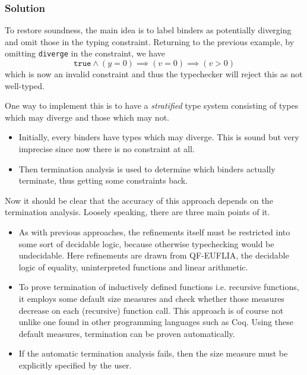 \documentclass[a4paper,UKenglish]{lipics-v2016}
\begin{document}
    \subsubsection{Solution}
      
      To restore soundness, the main idea is to label binders as potentially
      diverging and omit those in the typing constraint.  Returning to the
      previous example, by omitting \texttt{diverge} in the constraint, we have
      $$\mathtt{true}\wedge(y=0)\implies(v=0)\implies(v>0)$$
      which is now an invalid constraint and thus the typechecker will reject
      this as not well-typed.

      One way to implement this is to have a \emph{stratified} type system
      consisting of types which may diverge and those which may not.
      \begin{itemize}
        \item Initially, every binders have types which may diverge.  This is
          sound but very imprecise since now there is no constraint at all.
        \item Then termination analysis is used to determine which binders
          actually terminate, thus getting some constraints back.
      \end{itemize}

      Now it should be clear that the accuracy of this approach depends on the
      termination analysis.  Loosely speaking, there are three main points of
      it.
      \begin{itemize}
        \item As with previous approaches, the refinements itself must be
          restricted into some sort of decidable logic, because otherwise
          typechecking would be undecidable.  Here refinements are drawn from
          QF-EUFLIA, the decidable logic of equality, uninterpreted
          functions and linear arithmetic.
        \item To prove termination of inductively defined functions i.e.
          recursive functions, it employs some default size measures and check
          whether those measures decrease on each (recursive) function call.
          This approach is of course not unlike one found in other programming
          languages such as Coq. Using these default measures, termination can
          be proven automatically.
        \item If the automatic termination analysis fails, then the size
          measure must be explicitly specified by the user.
      \end{itemize}
\end{document}
